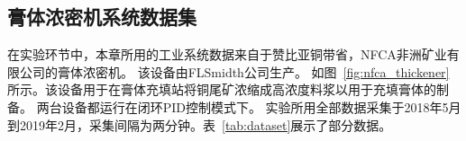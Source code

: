 \subsection{膏体浓密机系统数据集}
\label{sec:paste_introduction}
在实验环节中，本章所用的工业系统数据来自于赞比亚铜带省，NFCA非洲矿业有限公司的膏体浓密机。
该设备由FLSmidth公司生产。
如图~\ref{fig:nfca_thickener}所示。该设备用于在膏体充填站将铜尾矿浓缩成高浓度料浆以用于充填膏体的制备。
两台设备都运行在闭环PID控制模式下。
实验所用全部数据采集于2018年5月到2019年2月，采集间隔为两分钟。表~\ref{tab:dataset}展示了部分数据。
